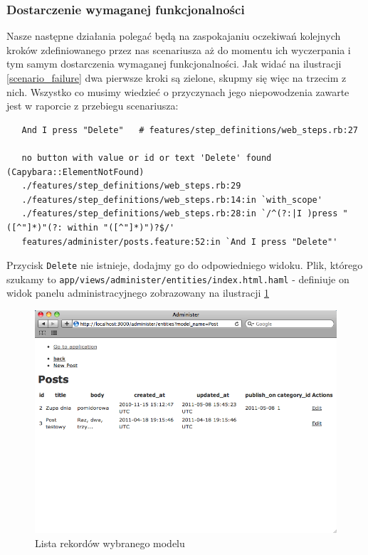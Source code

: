    \subsubsection{Dostarczenie wymaganej funkcjonalności}
   
   Nasze następne działania polegać będą na zaspokajaniu oczekiwań kolejnych kroków zdefiniowanego przez nas scenariusza aż do momentu ich wyczerpania i tym samym dostarczenia wymaganej funkcjonalności. Jak widać na ilustracji \ref{scenario_failure} dwa pierwsze kroki są zielone, skupmy się więc na trzecim z nich. Wszystko co musimy wiedzieć o przyczynach jego niepowodzenia zawarte jest w raporcie z przebiegu scenariusza:
   
   \begin{lstlisting}
   And I press "Delete"   # features/step_definitions/web_steps.rb:27
   
   no button with value or id or text 'Delete' found (Capybara::ElementNotFound)
   ./features/step_definitions/web_steps.rb:29
   ./features/step_definitions/web_steps.rb:14:in `with_scope'
   ./features/step_definitions/web_steps.rb:28:in `/^(?:|I )press "([^"]*)"(?: within "([^"]*)")?$/'
   features/administer/posts.feature:52:in `And I press "Delete"'
   \end{lstlisting}
   
   Przycisk \texttt{Delete} nie istnieje, dodajmy go do odpowiedniego widoku. Plik, którego szukamy to \texttt{app/views/administer/entities/index.html.haml} - definiuje on widok panelu administracyjnego zobrazowany na ilustracji \ref{administer_index}
   
   \clearpage
   
    \begin{figure}[!h]
  		\begin{center}
  			\includegraphics[width=\linewidth]{images/administer_index.png}
  			\caption{Lista rekordów wybranego modelu}
  			\label{administer_index}
  		\end{center}
  	\end{figure}
  	
